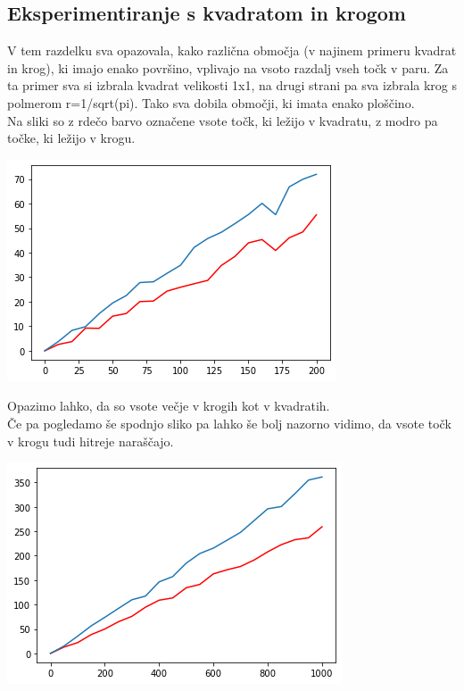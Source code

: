 \documentclass[12pt, a4paper]{article}
\begin{document}
\newpage

\subsection{Eksperimentiranje s kvadratom in krogom}
V tem razdelku sva opazovala, kako različna območja (v najinem primeru kvadrat in krog), ki imajo enako površino, vplivajo na vsoto razdalj vseh točk v paru. Za ta primer sva si izbrala kvadrat velikosti 1x1, na drugi strani pa sva izbrala krog s polmerom r=1/sqrt(pi). Tako sva dobila območji, ki imata enako ploščino.\\
Na sliki so z rdečo barvo označene vsote točk, ki ležijo v kvadratu, z modro pa točke, ki ležijo v krogu.\\
\begin{center}
\includegraphics{primerjava_krog_kvadrat.png}
\end{center}
Opazimo lahko, da so vsote večje v krogih kot v kvadratih.\\
Če pa pogledamo še spodnjo sliko pa lahko še bolj nazorno vidimo, da vsote točk v krogu tudi hitreje naraščajo.
\begin{center}
\includegraphics{primerjava_krog_kvadrat_2.png}
\end{center}
\end{document}
